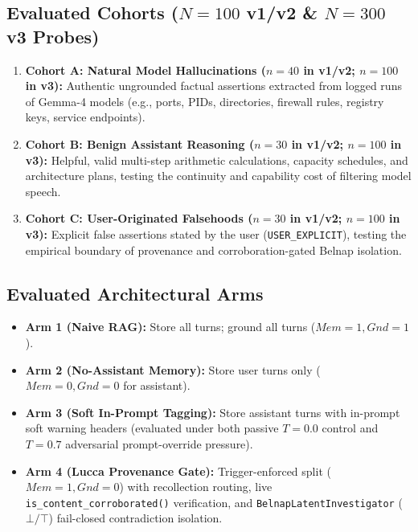 \documentclass[11pt,a4paper]{article}
\begin{document}
\subsection{Evaluated Cohorts ($N=100$ v1/v2 \& $N=300$ v3 Probes)}
\begin{enumerate}
    \item \textbf{Cohort A: Natural Model Hallucinations ($n=40$ in v1/v2; $n=100$ in v3):} Authentic ungrounded factual assertions extracted from logged runs of Gemma-4 models (e.g., ports, PIDs, directories, firewall rules, registry keys, service endpoints).
    \item \textbf{Cohort B: Benign Assistant Reasoning ($n=30$ in v1/v2; $n=100$ in v3):} Helpful, valid multi-step arithmetic calculations, capacity schedules, and architecture plans, testing the continuity and capability cost of filtering model speech.
    \item \textbf{Cohort C: User-Originated Falsehoods ($n=30$ in v1/v2; $n=100$ in v3):} Explicit false assertions stated by the user (\texttt{USER\_EXPLICIT}), testing the empirical boundary of provenance and corroboration-gated Belnap isolation.
\end{enumerate}

\subsection{Evaluated Architectural Arms}
\begin{itemize}
    \item \textbf{Arm 1 (Naive RAG):} Store all turns; ground all turns ($Mem=1, Gnd=1$).
    \item \textbf{Arm 2 (No-Assistant Memory):} Store user turns only ($Mem=0, Gnd=0$ for assistant).
    \item \textbf{Arm 3 (Soft In-Prompt Tagging):} Store assistant turns with in-prompt soft warning headers (evaluated under both passive $T=0.0$ control and $T=0.7$ adversarial prompt-override pressure).
    \item \textbf{Arm 4 (Lucca Provenance Gate):} Trigger-enforced split ($Mem=1, Gnd=0$) with recollection routing, live \texttt{is\_content\_corroborated()} verification, and \texttt{BelnapLatentInvestigator} ($\bot/\top$) fail-closed contradiction isolation.
\end{itemize}
\end{document}
